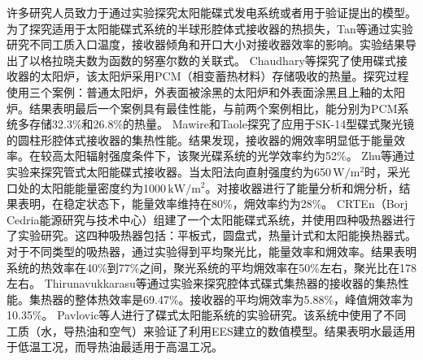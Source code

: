 许多研究人员致力于通过实验探究太阳能碟式发电系统或者用于验证提出的模型。
为了探究适用于太阳能碟式系统的半球形腔体式接收器的热损失，Tan等\cite{Tan2014b}通过实验研究不同工质入口温度，接收器倾角和开口大小对接收器效率的影响。实验结果导出了以格拉晓夫数为函数的努塞尔数的关联式。
Chaudhary等\cite{Chaudhary2013}探究了使用碟式接收器的太阳炉，该太阳炉采用PCM（相变蓄热材料）存储吸收的热量。探究过程使用三个案例：普通太阳炉，外表面被涂黑的太阳炉和外表面涂黑且上釉的太阳炉。结果表明最后一个案例具有最佳性能，与前两个案例相比，能分别为PCM系统多存储32.3\%和26.8\%的热量。
Mawire和Taole\cite{Mawire2014}探究了应用于SK-14型碟式聚光镜的圆柱形腔体式接收器的集热性能。结果发现，接收器的㶲效率明显低于能量效率。在较高太阳辐射强度条件下，该聚光碟系统的光学效率约为52\%。
Zhu等\cite{Zhu2015}通过实验来探究管式太阳能碟式接收器。当太阳法向直射强度约为650$\,\mathrm{W/m^2}$时，采光口处的太阳能能量密度约为1000$\,\mathrm{kW/m^2}$。对接收器进行了能量分析和㶲分析，结果表明，在稳定状态下，能量效率维持在80\%，㶲效率约为28\%。
CRTEn（Borj Cedria能源研究与技术中心）组建了一个太阳能碟式系统，并使用四种吸热器进行了实验研究。这四种吸热器包括：平板式，圆盘式，热量计式和太阳能换热器式。对于不同类型的吸热器，通过实验得到平均聚光比，能量效率和㶲效率。结果表明系统的热效率在40\%到77\%之间，聚光系统的平均㶲效率在50\%左右，聚光比在178左右。
Thirunavukkarasu等\cite{Thirunavukkarasu2017}通过实验来探究腔体式碟式集热器的接收器的集热性能。集热器的整体热效率是69.47\%。接收器的平均㶲效率为5.88\%，峰值㶲效率为10.35\%。
Pavlovic等人\cite{Pavlovic2017}进行了碟式太阳能系统的实验研究。该系统中使用了不同工质（水，导热油和空气）来验证了利用EES建立的数值模型。结果表明水最适用于低温工况，而导热油最适用于高温工况。

